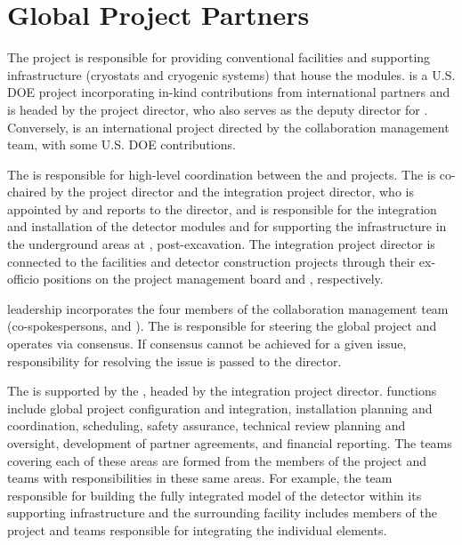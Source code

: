 \section{Global Project Partners}
\label{sec:partners}


The  project is responsible for providing conventional
facilities and supporting infrastructure (cryostats and cryogenic
systems)  that house the   modules.  is a U.S. DOE
project incorporating in-kind contributions from international
partners and is headed by the  project director, who also serves as
the  deputy director for .  Conversely,  is an
international project 
directed by the  collaboration management team, with some U.S. DOE contributions. 

The  is responsible for
high-level coordination between the  and 
projects.  The  is co-chaired by the  project director and the
integration project director, who is appointed by and reports to the
  director, and is responsible for the integration and
installation of the detector modules and for supporting the  
infrastructure in the underground areas at , post-excavation.  The
integration project director is connected to the facilities and
detector construction projects through their ex-officio positions on
the  project management board and  ,
respectively.

 leadership incorporates the four members of the 
collaboration management team (co-spokespersons,  and
).  The  is responsible for steering the global
project and operates via consensus.  %
If consensus cannot be achieved for a given issue, responsibility for
resolving the issue is passed to the  director.

The  is supported by the , headed by the
integration project director.   functions include global project
configuration and integration, installation planning and coordination,
scheduling, safety assurance, technical review planning and oversight,
development of partner agreements, and financial reporting.  The 
teams covering each of these areas are formed from the members of the
 project and   teams with
responsibilities in these same areas. %
For example, the  team
responsible for building the fully integrated model of the detector
within its supporting infrastructure and the surrounding facility
includes members of the  project and  
teams responsible for integrating the individual elements.

